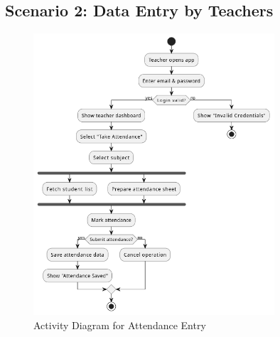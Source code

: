 \subsection{Scenario 2: Data Entry by Teachers}
\begin{figure}[H]
    \centering
    \includegraphics[width=0.8\textwidth]{Graphics/Activity_Diagram_teacher_takes_attendance.png}
    \caption{Activity Diagram for Attendance Entry}
    \label{fig:activity_diagram_data_entry}
\end{figure}

